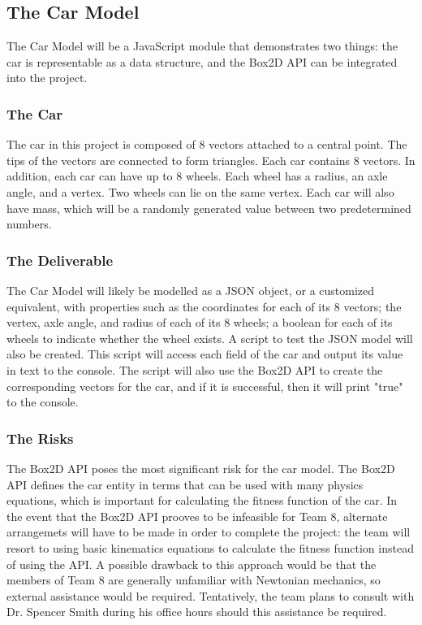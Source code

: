 \documentclass{article}
\begin{document}
\subsection{The Car Model}
The Car Model will be a JavaScript module that demonstrates two things: the car 
is representable as a data structure, and the Box2D API can be integrated into 
the project. 

\subsubsection{The Car}
The car in this project is composed of 8 vectors attached to a central point. The 
tips of the vectors are connected to form triangles. Each car contains 8 
vectors. In addition, each car can have up to 8 wheels. Each wheel has a radius, 
an axle angle, and a vertex. Two wheels can lie on the same vertex. Each car 
will also have mass, which will be a randomly generated value between two 
predetermined numbers.

\subsubsection{The Deliverable}
The Car Model will likely be modelled as a JSON object, or a customized 
equivalent, with properties such as the coordinates for each of its 8 vectors; 
the vertex, axle angle, and radius of each of its 8 wheels; a boolean for each 
of its wheels to indicate whether the wheel exists. A script to test the JSON 
model will also be created. This script will access each field of the car and 
output its value in text to the console. The script will also use the Box2D API 
to create the corresponding vectors for the car, and if it is successful, then 
it will print "true" to the console.

\subsubsection{The Risks}
The Box2D API poses the most significant risk for the car model. The Box2D API defines the car entity in terms that can be used with many physics equations, which is important for calculating the fitness function of the car. In the event that the Box2D API prooves to be infeasible for Team 8, alternate arrangemets will have to be made in order to complete the project: the team will resort to using basic kinematics equations to calculate the fitness function instead of using the API. A possible drawback to this approach would be that the members of Team 8 are generally unfamiliar with Newtonian mechanics, so external assistance would be required. Tentatively, the team plans to consult with Dr. Spencer Smith during his office hours should this assistance be required.
\end{document}
